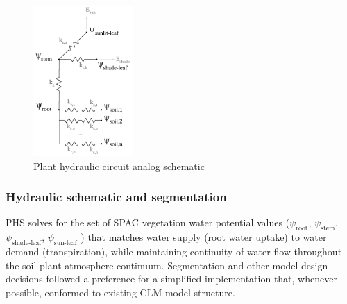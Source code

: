 \documentclass[draft,linenumbers]{agujournal}
\begin{document}
  \begin{figure}[h]
     \centering
     \includegraphics[width=9pc]{../figs/circuit.pdf}
     \caption{Plant hydraulic circuit analog schematic}
     \label{circuit}
  \end{figure}

  \subsubsection{Hydraulic schematic and segmentation}
  PHS solves for the set of SPAC vegetation water potential values
  ($\psi_{\text{root}}$, $\psi_{\text{stem}}$, $\psi_{\text{shade-leaf}}$, $\psi_{\text{sun-leaf}}$ ) 
  that matches water supply (root water uptake) to water demand (transpiration), 
  while maintaining continuity of water flow throughout the soil-plant-atmosphere continuum.
  Segmentation and other model design decisions followed a preference for a simplified implementation that,
  whenever possible, conformed to existing CLM model structure.
  
\end{document}
